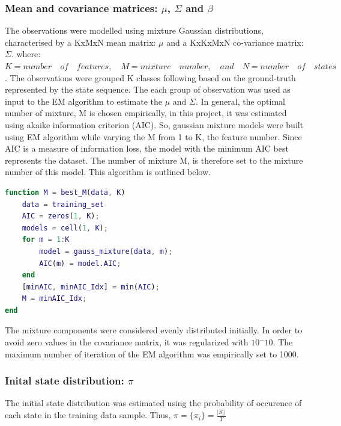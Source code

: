 \subsubsection{Mean and covariance matrices: \(\mu\), \(\Sigma\) and \(\beta\)}

The observations were modelled using mixture Gaussian distributions, characterised by a KxMxN mean matrix: \(\mu\) and a KxKxMxN co-variance matrix: \(\Sigma\).
where: \\ \(K = number \quad of \quad features, \quad M = mixture \quad number, \quad and \quad N = number \quad of \quad states\).
The observations were grouped K classes following based on the ground-truth represented by the state sequence.
The each group of observation was used as input to the EM algorithm to estimate the  \(\mu\) and \(\Sigma\).
In general, the optimal number of mixture, M is chosen empirically, in this project, it was estimated using akaike information criterion (AIC).
So, gaussian mixture models were built using EM algorithm while varying the M from 1 to K, the feature number.
Since AIC is a measure of information loss, the model with the minimum AIC best represents the dataset. The number of mixture M, is therefore set to the mixture number of this model.
This algorithm is outlined below.
\begin{lstlisting}[language=Matlab] 
function M = best_M(data, K)
	data = training_set
	AIC = zeros(1, K);
	models = cell(1, K);
	for m = 1:K
		model = gauss_mixture(data, m);
		AIC(m) = model.AIC;
	end
	[minAIC, minAIC_Idx] = min(AIC);
	M = minAIC_Idx;
end
\end{lstlisting} 

The mixture components were considered evenly distributed initially.
In order to avoid zero values in the covariance matrix, it was regularized with \(10^-10\).
The maximum number of iteration of the EM algorithm was empirically set to 1000.

\subsubsection{Inital state distribution: \(\pi\)}
The initial state distribution was estimated using the probability of occurence of each state in the training data sample.
Thus, \(\pi = \{\pi_i\} = \frac{|S_i|}{T} \)

